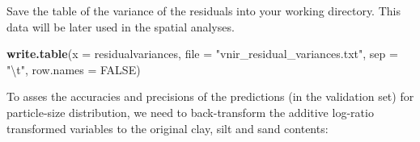 \documentclass[]{book}
\newenvironment{Shaded}{\begin{snugshade}}{\end{snugshade}}
\newcommand{\CharTok}[1]{\textcolor[rgb]{0.31,0.60,0.02}{#1}}
\newcommand{\CommentTok}[1]{\textcolor[rgb]{0.56,0.35,0.01}{\textit{#1}}}
\newcommand{\DataTypeTok}[1]{\textcolor[rgb]{0.13,0.29,0.53}{#1}}
\newcommand{\KeywordTok}[1]{\textcolor[rgb]{0.13,0.29,0.53}{\textbf{#1}}}
\newcommand{\NormalTok}[1]{#1}
\newcommand{\OperatorTok}[1]{\textcolor[rgb]{0.81,0.36,0.00}{\textbf{#1}}}
\newcommand{\OtherTok}[1]{\textcolor[rgb]{0.56,0.35,0.01}{#1}}
\newcommand{\StringTok}[1]{\textcolor[rgb]{0.31,0.60,0.02}{#1}}
\begin{document}
\begin{Shaded}
\end{Shaded}

Save the table of the variance of the residuals into your working directory. This data will be later used in the spatial analyses.

\begin{Shaded}
\begin{Highlighting}[]
\KeywordTok{write.table}\NormalTok{(}\DataTypeTok{x =}\NormalTok{ residualvariances, }\DataTypeTok{file =} \StringTok{"vnir_residual_variances.txt"}\NormalTok{, }\DataTypeTok{sep =} \StringTok{"}\CharTok{\textbackslash{}t}\StringTok{"}\NormalTok{, }
                    \DataTypeTok{row.names =} \OtherTok{FALSE}\NormalTok{)}
\end{Highlighting}
\end{Shaded}

To asses the accuracies and precisions of the predictions (in the validation set) for particle-size distribution, we need to back-transform the additive log-ratio transformed variables to the original clay, silt and sand contents:
\end{document}

